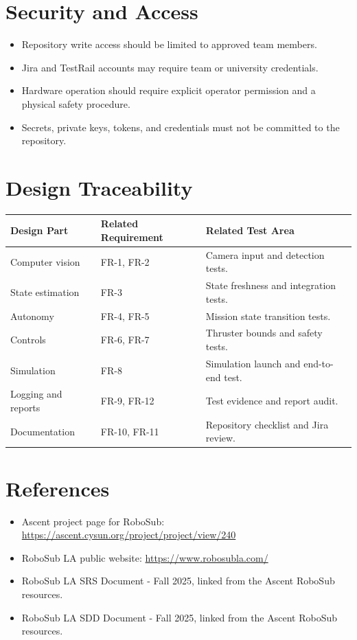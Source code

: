 \documentclass[12pt]{article}
\begin{document}
\section{Security and Access}
\begin{itemize}[leftmargin=*]
  \item Repository write access should be limited to approved team members.
  \item Jira and TestRail accounts may require team or university credentials.
  \item Hardware operation should require explicit operator permission and a physical safety procedure.
  \item Secrets, private keys, tokens, and credentials must not be committed to the repository.
\end{itemize}

\section{Design Traceability}
\begin{longtable}{|p{}|p{}|p{}|}
\hline
\textbf{Design Part} & \textbf{Related Requirement} & \textbf{Related Test Area} \\
\hline
Computer vision & FR-1, FR-2 & Camera input and detection tests. \\
\hline
State estimation & FR-3 & State freshness and integration tests. \\
\hline
Autonomy & FR-4, FR-5 & Mission state transition tests. \\
\hline
Controls & FR-6, FR-7 & Thruster bounds and safety tests. \\
\hline
Simulation & FR-8 & Simulation launch and end-to-end test. \\
\hline
Logging and reports & FR-9, FR-12 & Test evidence and report audit. \\
\hline
Documentation & FR-10, FR-11 & Repository checklist and Jira review. \\
\hline
\end{longtable}

\section{References}
\begin{itemize}[leftmargin=*]
  \item Ascent project page for RoboSub: \url{https://ascent.cysun.org/project/project/view/240}
  \item RoboSub LA public website: \url{https://www.robosubla.com/}
  \item RoboSub LA SRS Document - Fall 2025, linked from the Ascent RoboSub resources.
  \item RoboSub LA SDD Document - Fall 2025, linked from the Ascent RoboSub resources.
\end{itemize}
\end{document}
